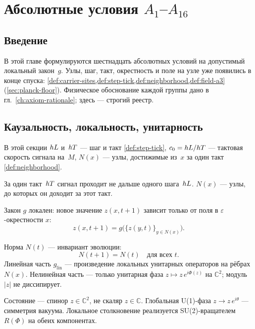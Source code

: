 \chapter{Абсолютные условия \texorpdfstring{$A_1$--$A_{16}$}{A1-A16}}
\label{ch:axioms}

\section{Введение}

В этой главе формулируются шестнадцать абсолютных условий на допустимый локальный закон~$g$.
Узлы, шаг, такт, окрестность и поле на узле уже появились в конце спуска:
\cref{def:carrier-sites,def:step-tick,def:neighborhood,def:field-a3}
(\cref{sec:planck-floor}).
Физическое обоснование каждой группы дано в гл.~\ref{ch:axiom-rationale};
здесь --- строгий реестр.

\section{Каузальность, локальность, унитарность}

В этой секции $hL$ и~$hT$ --- шаг и такт \cref{def:step-tick},
$c_0=hL/hT$ --- тактовая скорость сигнала на~$M$,
$N(x)$ --- узлы, достижимые из~$x$ за один такт \cref{def:neighborhood}.

\begin{axiom}[A1 · Каузальность]
\label{ax:A1}
За один такт~$hT$ сигнал проходит не дальше одного шага~$hL$.
$N(x)$ --- узлы, до которых он доходит за этот такт.
\end{axiom}

\begin{axiom}[A2 · Локальность]
\label{ax:A2}
Закон $g$ локален: новое значение $z(x,t+1)$ зависит только от поля в $\varepsilon$-окрестности $x$:
\[
  z(x,t+1)=g\bigl(\{z(y,t)\}_{y\in N(x)}\bigr).
\]
\end{axiom}

\begin{axiom}
\label{ax:A3}
Норма $N(t)$ --- инвариант эволюции:
\[
N(t+1)=N(t)\quad\text{для всех }t.
\]
Линейная часть $g_{\mathrm{lin}}$ --- произведение локальных унитарных операторов на рёбрах $N(x)$.
Нелинейная часть --- только унитарная фаза $z\mapsto z\,e^{i\Phi(z)}$ на $\mathbb{C}^2$; модуль $|z|$ не диссипирует.
\end{axiom}

\begin{axiom}
\label{ax:A4}
Состояние --- спинор $z\in\mathbb{C}^2$, не скаляр $z\in\mathbb{C}$.
Глобальная U(1)-фаза $z\to z\,e^{i\theta}$ --- симметрия вакуума.
Локальное столкновение реализуется SU(2)-вращателем $R(\Phi)$ на обеих компонентах.
\end{axiom}

